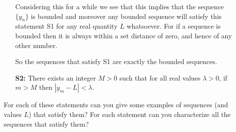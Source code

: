 \documentclass[oneside,10pt]{amsart}
\newcounter{pass}
\newif\ifshowanswers
\newcommand{\solution}[1]{\ifshowanswers{\newline\colorbox{black!20}{\begin{minipage}{\linewidth}\color{black}{#1}\end{minipage}}
}\else\fi}
\begin{document}
\begin{enumerate}
\begin{itemize}
{Considering this for a while we see that this implies that the sequence $\{y_n\}$ is bounded and moreover any bounded sequence will satisfy this statement S1 for any real quantity $L$ whatsoever. For if a sequence is bounded then it is always within a set distance of zero, and hence of any other number.

So the sequences that satisfy S1 are exactly the bounded sequences.}
    \item[\textbf{S2:}]
    There exists an integer $M > 0$ such that for all real values $\lambda > 0$, if $m > M$ then $\left | y_m - L \right | < \lambda$.
\solution{This statement says that after some point $y_M$, the sequence terms are within the distance $\lambda$ of this quantity $L$, and that this is true for \textbf{any} real $\lambda > 0$. How can sequence terms be arbitrarily close to some quanitity $L$? This is only possible if all these sequence elements are actually equal to $L$.

So the statement S2 is true, only of the sequences which are \emph{eventually constant}, i.e. after some point all the sequence elements are equal to this quantity $L$.}
    \end{itemize}
For each of these statements can you give some examples of sequences (and values $L$) that satisfy them? For each statement can you characterize all the sequences that satisfy them?

\setcounter{pass}{\value{enumi}}
\end{enumerate}
\end{document}
